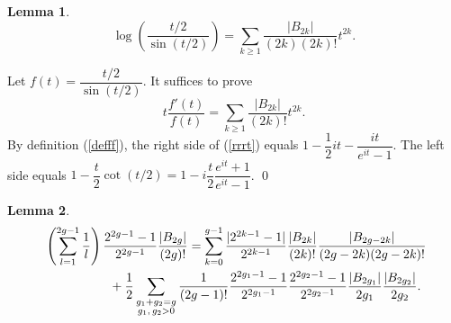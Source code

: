 \documentclass[11 pt]{amsart}
\newtheorem{lm}{Lemma}
\newcommand{\bpf}{\noindent {\em Proof.} }
\newcommand{\epf}{\qed \vspace{+10pt}}
\begin{document}
\begin{lm} 
$$
\log \left( \frac{t/2}{\sin(t/2)} \right) =
\sum_{k\ge1} \frac{|B_{2k}|}{(2k)(2k)!}t^{2k} .
$$
\end{lm}

\bpf
Let $f(t)=\dfrac{t/2}{\sin(t/2)}$. It suffices to prove
\begin{equation}
\label{rrrt}
t\frac{f'(t)}{f(t)}=\sum_{k\ge1}\frac{|B_{2k}|}{(2k)!}t^{2k}.
\end{equation}
By definition (\ref{defff}), the right  side of (\ref{rrrt}) equals 
$1-\dfrac12it-
\dfrac{it}{e^{it}-1}.$
The left side equals $1-\dfrac{t}2\cot(t/2)=1-i\dfrac{t}2
\dfrac{e^{it}+1}{e^{it}-1}$. \epf


\begin{lm} \label{Zag}
\begin{eqnarray*}
\lefteqn{
\left(\sum_{l=1}^{2g-1}\frac1l\right)\frac{2^{2g-1}-1}{2^{2g-1}}
\frac{|B_{2g}|}{(2g)!}=
\sum_{k=0}^{g-1}
\frac{|2^{2k-1}-1|}{2^{2k-1}}
\frac{|B_{2k}|}{(2k)!}
\frac{|B_{2g-2k}|}{(2g-2k)(2g-2k)!} } \cr
&&\qquad\qquad\mbox{}+\frac12\sum_{\substack{g_1+g_2=g\\g_1,\,g_2>0}}
\frac1{(2g-1)!}
\frac{2^{2g_1-1}-1}{2^{2g_1-1}}
\frac{2^{2g_2-1}-1}{2^{2g_2-1}}
\frac{|B_{2g_1}|}{2g_1}
\frac{|B_{2g_2}|}{2g_2}.
\end{eqnarray*}
\end{lm}
\end{document}
